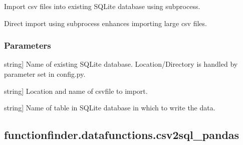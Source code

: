 \documentclass[letterpaper,10pt,english]{sphinxmanual}
\begin{document}
\begin{fulllineitems}
\label{\detokenize{_autosummary/functionfinder.datafunctions.csv2sql_directly:functionfinder.datafunctions.csv2sql_directly}}
\pysigstartsignatures
{}
\pysigstopsignatures
\sphinxAtStartPar
Import csv files into existing SQLite database using subprocess.

\sphinxAtStartPar
Direct import using subprocess enhances importing large csv files.


\subsubsection{Parameters}
\label{\detokenize{_autosummary/functionfinder.datafunctions.csv2sql_directly:parameters}}\begin{description}
\sphinxlineitem{existing\_db}{[}string{]}
\sphinxAtStartPar
Name of existing SQLite database. Location/Directory is handled by
parameter set in config.py.

\sphinxlineitem{csv\_toadd}{[}string{]}
\sphinxAtStartPar
Location and name of csv\sphinxhyphen{}file to import.

\sphinxlineitem{tablename}{[}string{]}
\sphinxAtStartPar
Name of table in SQLite database in which to write the data.

\end{description}

\end{fulllineitems}


\sphinxstepscope


\subsection{functionfinder.datafunctions.csv2sql\_pandas}
\label{\detokenize{_autosummary/functionfinder.datafunctions.csv2sql_pandas:functionfinder-datafunctions-csv2sql-pandas}}\label{\detokenize{_autosummary/functionfinder.datafunctions.csv2sql_pandas::doc}}
\end{document}
